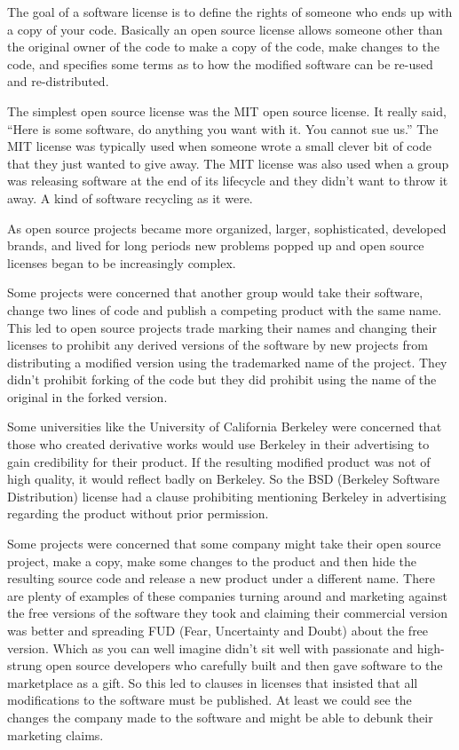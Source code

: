 \documentclass[12pt]{book}
\begin{document}
The goal of a software license is to define the rights
of someone who ends up with a copy of your code.
Basically an open source license allows
someone other than the original owner of the code
to make a copy of the code, make changes to the code,
and specifies some terms as to how the modified
software can be re-used and re-distributed.

The simplest open source license was the MIT open
source license.  It really said, ``Here is some
software, do anything you want with it.  You cannot
sue us.''
The MIT license was typically used when someone wrote
a small clever bit of code that they just wanted to
give away.  The MIT license was also used when
a group was releasing software at the end of
its lifecycle and they didn't want to throw it away.
A kind of software recycling as it were.

As open source projects became more organized,
larger, sophisticated, developed brands, and lived
for long periods new problems popped up and
open source licenses began to be increasingly
complex.

Some projects were concerned that another group
would take their software, change two lines of
code and publish a competing product with the
same name.   This led to open source projects
trade marking their names and changing their
licenses to prohibit any derived versions of the
software by new projects from distributing
a modified version using the trademarked
name of the project.  They didn't prohibit
forking of the code but they did prohibit
using the name of the original in the forked
version.

Some universities like the University of California
Berkeley were concerned that those who created
derivative works would use Berkeley in their advertising
to gain credibility for their product.
If the resulting modified product was not of
high quality, it would reflect badly on Berkeley.
So the BSD (Berkeley Software Distribution) license
had a clause prohibiting mentioning Berkeley in
advertising regarding the product without
prior permission.

Some projects were concerned that some company might
take their open source project, make a copy, make
some changes to the product and then hide the
resulting source code and release a new product
under a different name.  There are plenty of examples
of these companies turning around and marketing
against the free versions of the software they took
and claiming their commercial version was better
and spreading FUD (Fear, Uncertainty and Doubt)
about the free version.  Which as you can well
imagine didn't sit well with
passionate and high-strung open source
developers who carefully
built and then gave software to the marketplace
as a gift.  So this led to clauses in licenses
that insisted that all modifications to the
software must be published.  At least we could
see the changes the company made to the software
and might be able to debunk their marketing claims.
\end{document}
